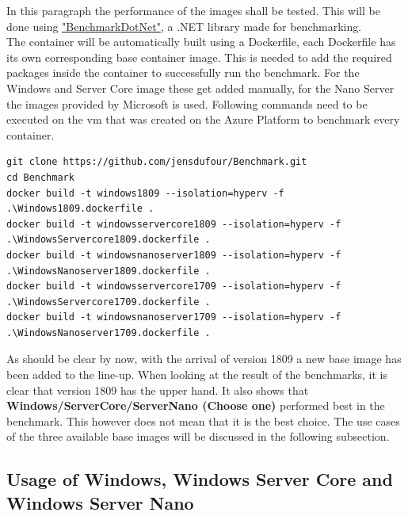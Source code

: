 In this paragraph the performance of the images shall be tested. This will be done using \href{https://benchmarkdotnet.org/}{"BenchmarkDotNet"}, a .NET library made for benchmarking. 
\autocite{Akinshin2019} 
\\
The container will be automatically built using a Dockerfile, each Dockerfile has its own corresponding base container image. This is needed to add the required packages inside the container to successfully run the benchmark. For the Windows and Server Core image these get added manually, for the Nano Server the images provided by Microsoft is used. Following commands need to be executed on the \acrshort{vm} that was created on the Azure Platform to benchmark every container.
\begin{lstlisting}[breaklines]
git clone https://github.com/jensdufour/Benchmark.git
cd Benchmark	
docker build -t windows1809 --isolation=hyperv -f .\Windows1809.dockerfile .
docker build -t windowsservercore1809 --isolation=hyperv -f .\WindowsServercore1809.dockerfile .
docker build -t windowsnanoserver1809 --isolation=hyperv -f .\WindowsNanoserver1809.dockerfile .
docker build -t windowsservercore1709 --isolation=hyperv -f .\WindowsServercore1709.dockerfile .
docker build -t windowsnanoserver1709 --isolation=hyperv -f .\WindowsNanoserver1709.dockerfile .
\end{lstlisting}


As should be clear by now, with the arrival of version 1809 a new base image has been added to the line-up. When looking at the result of the benchmarks, it is clear that version 1809 has the upper hand. It also shows that \textbf{Windows/ServerCore/ServerNano (Choose one)} performed best in the benchmark. This however does not mean that it is the best choice. The use cases of the three available base images will be discussed in the following subsection.

\subsection{Usage of Windows, Windows Server Core and Windows Server Nano}